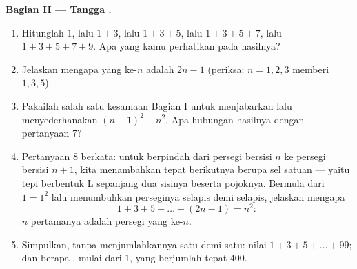 \begin{problem}[{Soal akhir pekan --- $(a+b)^2$, $(a-b)^2$,
$(a+b)(a-b)$, dan jumlah $1 + 3 + 5 + \dots + (2n-1) = n^2$}]
\medskip
\noindent\textbf{Bagian II --- Tangga .}
\begin{enumerate}[resume]
  \item Hitunglah $1$, lalu $1 + 3$, lalu $1 + 3 + 5$, lalu
        $1 + 3 + 5 + 7$, lalu $1 + 3 + 5 + 7 + 9$. Apa yang kamu
        perhatikan pada hasilnya?
  \item Jelaskan mengapa  yang ke-$n$ adalah
        $2n - 1$ (periksa: $n = 1, 2, 3$ memberi $1, 3, 5$).
  \item Pakailah salah satu kesamaan Bagian I untuk menjabarkan lalu
        menyederhanakan $(n + 1)^2 - n^2$. Apa hubungan hasilnya
        dengan pertanyaan 7?
  \item Pertanyaan 8 berkata: untuk berpindah dari persegi bersisi
        $n$ ke persegi bersisi $n + 1$, kita menambahkan tepat
         berikutnya berupa sel satuan --- yaitu tepi
        berbentuk L sepanjang dua sisinya beserta pojoknya. Bermula
        dari $1 = 1^2$ lalu menumbuhkan perseginya selapis demi
        selapis, jelaskan mengapa
        \[
        1 + 3 + 5 + \dots + (2n - 1) = n^2 :
        \]
         $n$  pertamanya adalah persegi
        yang ke-$n$.
  \item Simpulkan, tanpa menjumlahkannya satu demi satu: nilai
        $1 + 3 + 5 + \dots + 99$; dan berapa , mulai
        dari $1$, yang berjumlah tepat $400$.
\end{enumerate}


\end{problem}

